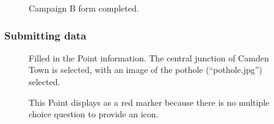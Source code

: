 \documentclass{article}
\begin{document}
		\begin{figure}[H]
			\centering
			\caption{Campaign B form completed.}
			\label{fig:eval-cb-1}
		\end{figure}

		\subsubsection{Submitting data}

		\begin{figure}[H]
			\centering
			\caption{Filled in the Point information. The central junction of Camden Town is selected, with an image of the pothole (``pothole.jpg'') selected.}
			\label{fig:eval-cb-2}
		\end{figure}

		\begin{figure}[H]
			\centering
			\caption{This Point displays as a red marker because there is no multiple choice question to provide an icon.}
			\label{fig:eval-cb-3}
		\end{figure}
\end{document}
